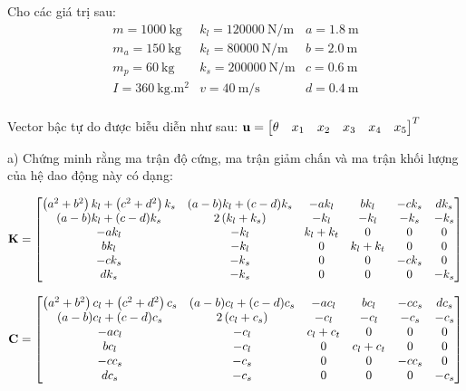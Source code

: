 Cho các giá trị sau:
\begin{equation*}
    \begin{matrix}
        m = \SI{1000}{\kilogram} & k_l = \SI{120000}{\newton\per\meter} & a = \SI{1.8}{\meter} \\
        m_a = \SI{150}{\kilogram} & k_t = \SI{80000}{\newton\per\meter} &  b = \SI{2.0}{\meter} \\
        m_p = \SI{60}{\kilogram} & k_s = \SI{200000}{\newton\per\meter} &  c = \SI{0.6}{\meter} \\
        I = \SI{360}{\kilogram.\m^2} & v = \SI{40}{\meter\per\second} &  d = \SI{0.4}{\meter} \\
    \end{matrix}
\end{equation*}

Vector bậc tự do được biễu diễn như sau: ${\bf u} = \begin{bmatrix}
    \theta & x_1 & x_2 & x_3 & x_4 & x_5 \end{bmatrix}^T$

a) Chứng minh rằng ma trận độ cứng, ma trận giảm chấn và ma trận khối lượng của hệ dao động này có dạng:

\begin{equation}
    {\bf K} = \begin{bmatrix}
        \left(a^2+b^2\right) k_l+\left(c^2+d^2\right) k_s & (a-b) k_l+(c-d) k_s & -a k_l & b k_l & -c k_s & d k_s \\
        (a-b) k_l+(c-d) k_s & 2\left(k_l+k_s\right) & -k_l & -k_l & -k_s & -k_s \\
        -a k_l & -k_l & k_l+k_t & 0 & 0 & 0 \\
        b k_l & -k_l & 0 & k_l+k_t & 0 & 0 \\
        -c k_s & -k_s & 0 & 0 & -c k_s & 0 \\
        d k_s & -k_s & 0 & 0 & 0 & -k_s
    \end{bmatrix}
\end{equation}

\begin{equation}
    {\bf C} = \begin{bmatrix}
        \left(a^2+b^2\right) c_l+\left(c^2+d^2\right) c_s & (a-b) c_l+(c-d) c_s & -a c_l & b c_l & -c c_s & d c_s \\
        (a-b) c_l+(c-d) c_s & 2\left(c_l+c_s\right) & -c_l & -c_l & -c_s & -c_s \\
        -a c_l & -c_l & c_l+c_t & 0 & 0 & 0 \\
        b c_l & -c_l & 0 & c_l+c_t & 0 & 0 \\
        -c c_s & -c_s & 0 & 0 & -c c_s & 0 \\
        d c_s & -c_s & 0 & 0 & 0 & -c_s
    \end{bmatrix}
\end{equation}


